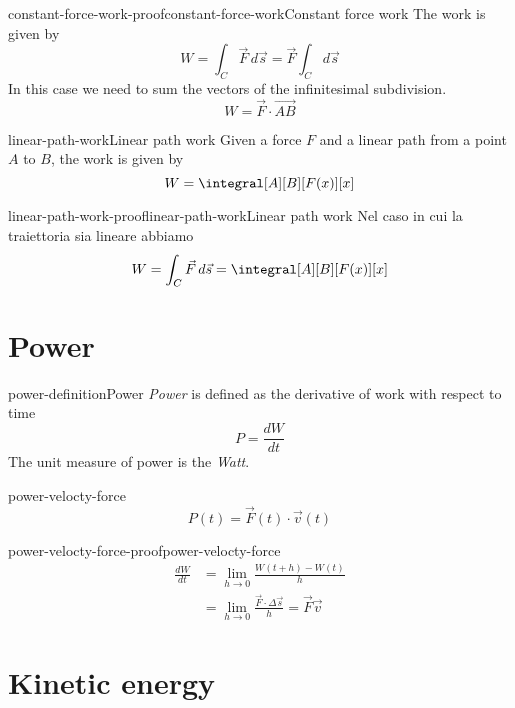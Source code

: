 \documentclass[preview]{standalone}
\begin{document}
\begin{snippetproof}{constant-force-work-proof}{constant-force-work}{Constant force work}
    The work is given by
    \[
        W = \int_C \vec{F}\,d\vec{s} = \vec{F} \int_C d\vec{s}
    \]
    In this case we need to sum the vectors of the infinitesimal subdivision.
    \[
        W = \vec{F} \cdot \vec{AB}
    \]
\end{snippetproof}

\begin{snippetproposition}{linear-path-work}{Linear path work}
    Given a force \(F\) and a linear path from a point \(A\) to \(B\), the work is given by
    \[
        W = \integral[A][B][F(x)][x]
    \]
\end{snippetproposition}

\begin{snippetproof}{linear-path-work-proof}{linear-path-work}{Linear path work}
    Nel caso in cui la traiettoria sia lineare abbiamo
    \[
        W = \int_C \vec{F}\,d\vec{s} = \integral[A][B][F(x)][x]
    \]
\end{snippetproof}

\section{Power}

\begin{snippetdefinition}{power-definition}{Power}
    \emph{Power} is defined as the derivative of work with respect to time
    \[
        P = \frac{dW}{dt}
    \]
    The unit measure of power is the \emph{Watt}.
\end{snippetdefinition}

\begin{snippetproposition}{power-velocty-force}{}
    \[
        P(t) = \vec{F}(t) \cdot \vec{v}(t)
    \]
\end{snippetproposition}

\begin{snippetproof}{power-velocty-force-proof}{power-velocty-force}{}
    \begin{align*}
        \frac{dW}{dt} &= \lim_{h\to 0} \frac{W(t + h) - W(t)}{h} \\
        &= \lim_{h\to 0} \frac{\vec{F} \cdot \Delta \vec{s}}{h} = \vec{F} \vec{v}
    \end{align*}
\end{snippetproof}

\section{Kinetic energy}
\end{document}
